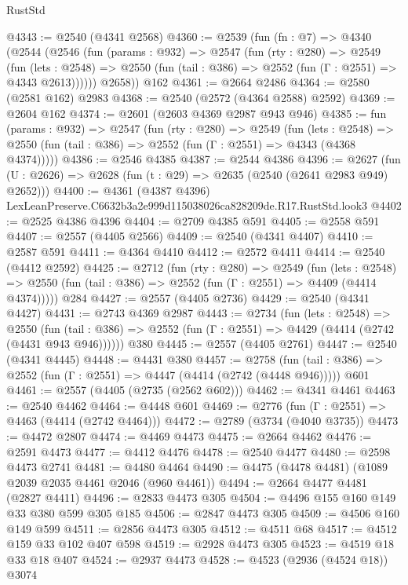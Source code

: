 \begin{lexlean}{RustStd}
\begin{coremodule}
@4343 := @2540 (@4341 @2568)
@4360 := @2539
    (fun (fn : @7) =>
    @4340
      (@2544
        (@2546
          (fun (params : @932) =>
          @2547
            (fun (rty : @280) =>
            @2549
              (fun (lets : @2548) =>
              @2550 (fun (tail : @386) => @2552 (fun (Γ : @2551) => @4343 @2613))))))
        @2658))
    @162
@4361 := @2664 @2486
@4364 := @2580 (@2581 @162) @2983
@4368 := @2540 (@2572 (@4364 @2588) @2592)
@4369 := @2604 @162
@4374 := @2601 (@2603 @4369 @2987 @943 @946)
@4385 := fun (params : @932) =>
  @2547
    (fun (rty : @280) =>
    @2549
      (fun (lets : @2548) =>
      @2550 (fun (tail : @386) => @2552 (fun (Γ : @2551) => @4343 (@4368 @4374)))))
@4386 := @2546 @4385
@4387 := @2544 @4386
@4396 := @2627 (fun (U : @2626) => @2628 (fun (t : @29) => @2635 (@2540 (@2641 @2983 @949) @2652)))
@4400 := @4361 (@4387 @4396) LexLeanPreserve.C6632b3a2e999d115038026ca828209de.R17.RustStd.look3
@4402 := @2525 @4386 @4396
@4404 := @2709 @4385 @591
@4405 := @2558 @591
@4407 := @2557 (@4405 @2566)
@4409 := @2540 (@4341 @4407)
@4410 := @2587 @591
@4411 := @4364 @4410
@4412 := @2572 @4411
@4414 := @2540 (@4412 @2592)
@4425 := @2712
    (fun (rty : @280) =>
    @2549
      (fun (lets : @2548) =>
      @2550 (fun (tail : @386) => @2552 (fun (Γ : @2551) => @4409 (@4414 @4374)))))
    @284
@4427 := @2557 (@4405 @2736)
@4429 := @2540 (@4341 @4427)
@4431 := @2743 @4369 @2987
@4443 := @2734
    (fun (lets : @2548) =>
    @2550 (fun (tail : @386) => @2552 (fun (Γ : @2551) => @4429 (@4414 (@2742 (@4431 @943 @946))))))
    @380
@4445 := @2557 (@4405 @2761)
@4447 := @2540 (@4341 @4445)
@4448 := @4431 @380
@4457 := @2758
    (fun (tail : @386) => @2552 (fun (Γ : @2551) => @4447 (@4414 (@2742 (@4448 @946)))))
    @601
@4461 := @2557 (@4405 (@2735 (@2562 @602)))
@4462 := @4341 @4461
@4463 := @2540 @4462
@4464 := @4448 @601
@4469 := @2776 (fun (Γ : @2551) => @4463 (@4414 (@2742 @4464)))
@4472 := @2789 (@3734 (@4040 @3735))
@4473 := @4472 @2807
@4474 := @4469 @4473
@4475 := @2664 @4462
@4476 := @2591 @4473
@4477 := @4412 @4476
@4478 := @2540 @4477
@4480 := @2598 @4473 @2741
@4481 := @4480 @4464
@4490 := @4475 (@4478 @4481) (@1089 @2039 @2035 @4461 @2046 (@960 @4461))
@4494 := @2664 @4477 @4481 (@2827 @4411)
@4496 := @2833 @4473 @305
@4504 := @4496 @155 @160 @149 @33 @380 @599 @305 @185
@4506 := @2847 @4473 @305
@4509 := @4506 @160 @149 @599
@4511 := @2856 @4473 @305
@4512 := @4511 @68
@4517 := @4512 @159 @33 @102 @407 @598
@4519 := @2928 @4473 @305
@4523 := @4519 @18 @33 @18 @407
@4524 := @2937 @4473
@4528 := @4523 (@2936 (@4524 @18)) @3074

\end{coremodule}
\end{lexlean}
